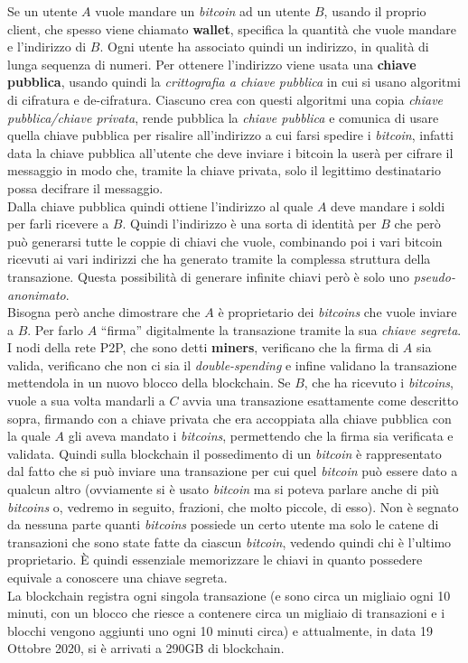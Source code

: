 \documentclass[a4paper,12pt, oneside]{book}
\begin{document}
Se un utente $A$ vuole mandare un \textit{bitcoin} ad un utente $B$, usando il
proprio client, che spesso viene chiamato \textbf{wallet}, specifica la quantità
che vuole mandare e l'indirizzo di $B$. Ogni utente ha associato quindi un
indirizzo, in qualità di lunga sequenza di numeri. Per ottenere l'indirizzo
viene usata una \textbf{chiave pubblica}, usando quindi la \textit{crittografia
  a chiave pubblica} in cui si usano algoritmi di cifratura e
de-cifratura. Ciascuno crea con questi algoritmi una copia \textit{chiave
  pubblica/chiave privata}, rende pubblica la \textit{chiave pubblica} e
comunica di usare quella chiave pubblica per risalire all'indirizzo a cui farsi
spedire i \textit{bitcoin}, infatti data la chiave pubblica all'utente che deve
inviare i bitcoin la userà per cifrare il messaggio in modo che, tramite la
chiave privata, solo il legittimo destinatario possa decifrare il messaggio.\\
Dalla chiave pubblica quindi ottiene l'indirizzo al quale $A$ deve mandare i
soldi per farli ricevere a $B$. Quindi l'indirizzo è una sorta di identità per
$B$ che però può generarsi tutte le coppie di chiavi che vuole, combinando poi i
vari bitcoin ricevuti ai vari indirizzi che ha generato tramite la complessa
struttura della transazione. Questa possibilità di generare infinite chiavi però
è solo uno \textit{pseudo-anonimato}. \\
Bisogna però anche dimostrare che $A$ è proprietario dei \textit{bitcoins} che
vuole inviare a $B$. Per farlo $A$ ``firma'' digitalmente la transazione tramite
la sua \textit{chiave segreta}. I nodi della rete P2P, che sono detti
\textbf{miners}, verificano che la firma di $A$ sia valida, verificano che non
ci sia il \textit{double-spending} e infine validano la transazione mettendola
in un nuovo blocco della blockchain. Se $B$, che ha ricevuto i
\textit{bitcoins}, vuole a sua volta mandarli a $C$ avvia una transazione
esattamente come descritto sopra, firmando con a chiave privata che era
accoppiata alla chiave pubblica con la quale $A$ gli aveva mandato i
\textit{bitcoins}, permettendo che la firma sia verificata e validata. Quindi
sulla blockchain il possedimento di un \textit{bitcoin} è rappresentato dal
fatto che si può inviare una transazione per cui quel \textit{bitcoin} può
essere dato a qualcun altro (ovviamente si è usato \textit{bitcoin} ma si poteva
parlare anche di più \textit{bitcoins} o, vedremo in seguito, frazioni, che
molto piccole, di 
esso). Non è segnato da nessuna parte quanti \textit{bitcoins} possiede un certo
utente ma solo le catene di transazioni che sono state fatte da ciascun
\textit{bitcoin}, vedendo quindi chi è l'ultimo proprietario. È quindi
essenziale memorizzare le chiavi in quanto possedere equivale a conoscere una
chiave segreta.\\ 
La blockchain registra ogni singola transazione (e sono circa un migliaio ogni
10 minuti, con un blocco che riesce a contenere circa un migliaio di
transazioni e i blocchi vengono aggiunti uno ogni 10 minuti circa) e
attualmente, in data 19 Ottobre 2020, si è arrivati a 290GB di blockchain.
\end{document}
